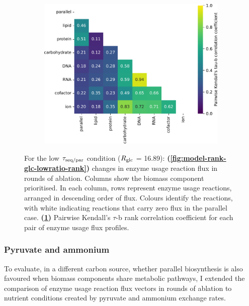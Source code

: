 \begin{figure}
\begin{subfigure}[t]{0.45\textwidth}
    \includegraphics[width=\linewidth]{CompareEnzUse_glc16p89_pyrUnres_ammUnres_2.pdf}
    \caption{
    }
    \label{fig:model-rank-glc-lowratio-kendall}
  \end{subfigure}

  \caption[
    Changes in enzyme usage reaction flux and Kendall's $\tau$-b rank correlation coefficient for each pair, $\exchrate{glc}$ = \SI{16.89}{\mmolgdwh}.
  ]{
    For the low $\tau_{\mathrm{seq}/\mathrm{par}}$ condition ($\exchrate{glc}$ = \SI{16.89}{\mmolgdwh}):
    \textbf{(\ref{fig:model-rank-glc-lowratio-rank})}
    changes in enzyme usage reaction flux in rounds of ablation.
    Columns show the biomass component prioritised.
    In each column, rows represent enzyme usage reactions, arranged in descending order of flux.
    Colours identify the reactions, with white indicating reactions that carry zero flux in the parallel case.
    \textbf{(\ref{fig:model-rank-glc-lowratio-kendall})}
    Pairwise Kendall's $\tau$-b rank correlation coefficient \parencite{kendallTREATMENTTIESRANKING1945} for each pair of enzyme usage flux profiles.
  }
  \label{fig:model-rank-glc-lowratio}
\end{figure}

\pagebreak

\subsubsection{Pyruvate and ammonium}
\label{subsec:model-rank-pyruvate}

To evaluate, in a different carbon source, whether parallel biosynthesis is also favoured when biomass components share metabolic pathways, I extended the comparison of enzyme usage reaction flux vectors in rounds of ablation to nutrient conditions created by pyruvate and ammonium exchange rates.

